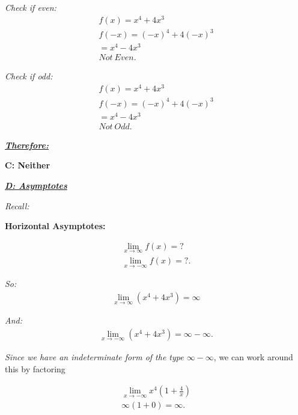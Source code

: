 \documentclass{report}
\begin{document}
  \bigbreak \noindent 
  \textit{Check if even:}
  \begin{align*}
    f(x) = x^{4} + 4x^{3} \\
    f(-x) = (-x)^{4} + 4(-x)^{3} \\
    = x^{4} -4x^{3} \\
    \boxed{Not\ Even}
  .\end{align*}

  \bigbreak \noindent 
  \textit{Check if odd:}
  \begin{align*}
    f(x) = x^{4} + 4x^{3} \\
    f(-x) = (-x)^{4} + 4(-x)^{3} \\
    = x^{4} -4x^{3} \\
    \boxed{Not\ Odd}
  .\end{align*}

  \bigbreak \noindent 
  \textbf{\textit{\underline{Therefore:}}}
  \begin{center}
    \textbf{C: Neither}
  \end{center}

  \bigbreak \noindent  \bigbreak \noindent 
  \textbf{\textit{\underline{D: Asymptotes}}}

  \bigbreak \noindent 
  \textit{Recall:}
  \begin{center}
    \textbf{Horizontal Asymptotes:}
  \end{center}
  \begin{align*}
    \lim_{x \to \infty}{f(x) = ?} \\
    \lim_{x \to -\infty}{f(x) = ?}
  .\end{align*}

  \bigbreak \noindent
  \textit{So:}
  \begin{align*}
    \boxed{\lim_{x \to \infty}{(x^{4}+4x^{3})} = \infty}
  \end{align*}

  \bigbreak \noindent 
  \textit{And:}
  \begin{align*}
    \lim_{x \to -\infty}{(x^{4}+4x^{3})} = \infty - \infty
  .\end{align*}

  \bigbreak \noindent 
  \textit{Since we have an indeterminate form of the type $\infty -\infty$}, we can work
  around this by factoring

  \begin{align*}
    \lim_{x \to -\infty}{x^{4}(1+\frac{4}{x})} \\
    \infty(1+0) = \infty
  .\end{align*}
\end{document}
